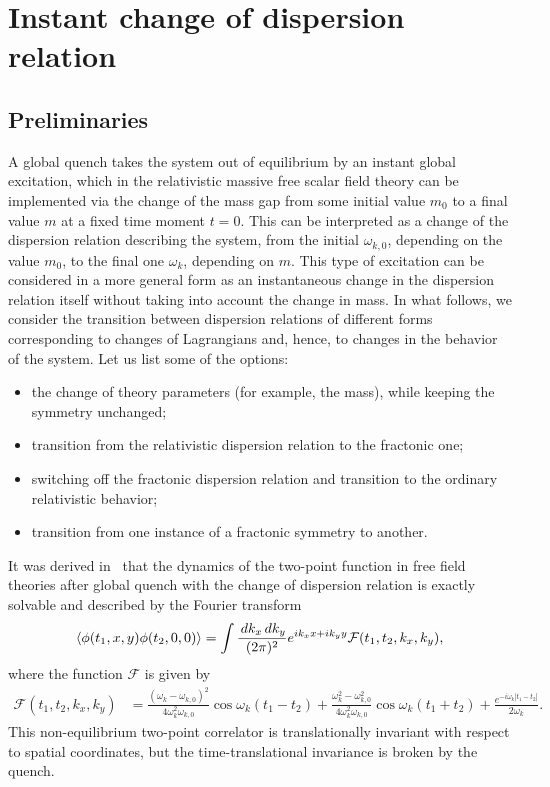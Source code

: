 \documentclass[a4paper,12pt]{article}
\newcommand{\be}{\begin{equation}}
\newcommand{\ee}{\end{equation}}
\DeclarePairedDelimiter\corrfunc{\langle}{\rangle}
\newcommand{\om}{\omega}
\begin{document}
\section{Instant change of dispersion relation}
\label{sec:mass-quench}

\subsection*{Preliminaries}

A global quench takes the system out of equilibrium by an instant global excitation, which in the relativistic massive free scalar field theory can be implemented via the change of the mass gap from some initial value $m_0$ to a final value $m$ at a fixed time moment $t = 0$. This can be interpreted as a change of the dispersion relation describing the system, from the initial $\om_{k,0}$, depending on the value $m_0$, to the final one $\om_k$, depending on $m$. This type of excitation can be considered in a more general form as an instantaneous change in the dispersion relation itself without taking into account the change in mass. In what follows, we consider the transition between dispersion relations of different forms corresponding to changes of Lagrangians and, hence, to changes in the behavior of the system. Let us list some of the options:
\begin{itemize}
    \item the change of theory parameters (for example, the mass), while keeping the symmetry unchanged;
    \item transition from the relativistic dispersion relation to the fractonic one;
    \item switching off the fractonic dispersion relation and transition to the ordinary relativistic behavior;
    \item transition from one instance of a fractonic symmetry to another.
\end{itemize}

It was derived in~\cite{Calabrese:2007rg, Sotiriadis:2010si} that the dynamics of the two-point function in free field theories after global quench with the change of dispersion relation is exactly solvable and described by the Fourier transform
\be
    \corrfunc{\phi(t_1, x, y)\phi(t_2, 0, 0)} = \int\frac{\,dk_x\,dk_y}{(2\pi)^2}e^{ik_xx + ik_yy} \mathcal{F}(t_1, t_2, k_x, k_y),
\ee
where the function $\mathcal{F}$ is given by
\be
    \begin{aligned}
        \mathcal{F}(t_1, t_2, k_x, k_y) & = \frac{(\om_k - \om_{k,0})^2}{4\om_k^2\om_{k,0}}\cos\om_k(t_1 - t_2) + \frac{\om_k^2 - \om_{k,0}^2}{4\om_k^2\om_{k,0}}\cos\om_k(t_1 + t_2) + \frac{e^{-i\om_k|t_1 - t_2|}}{2\om_k}.
    \end{aligned}
\ee
This non-equilibrium two-point correlator is translationally invariant with respect to spatial coordinates, but the time-translational invariance is broken by the quench.
\end{document}
